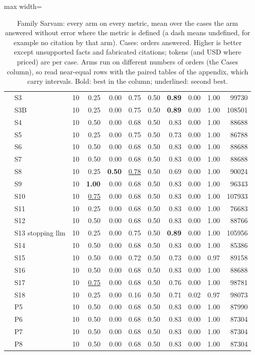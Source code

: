 \begin{table}[t]
\begin{adjustbox}{max width=\textwidth}
\begin{tabular}{@{}llrrrrrrrrr@{}}
 & S3 & 10 & 0.25 & 0.00 & 0.75 & 0.50 & \textbf{0.89} & 0.00 & 1.00 & 99730 \\
 & S3B & 10 & 0.25 & 0.00 & 0.75 & 0.50 & \textbf{0.89} & 0.00 & 1.00 & 108501 \\
 & S4 & 10 & 0.50 & 0.00 & 0.68 & 0.50 & 0.83 & 0.00 & 1.00 & 88688 \\
 & S5 & 10 & 0.25 & 0.00 & 0.75 & 0.50 & 0.73 & 0.00 & 1.00 & 86788 \\
 & S6 & 10 & 0.50 & 0.00 & 0.68 & 0.50 & 0.83 & 0.00 & 1.00 & 88688 \\
 & S7 & 10 & 0.50 & 0.00 & 0.68 & 0.50 & 0.83 & 0.00 & 1.00 & 88688 \\
 & S8 & 10 & 0.25 & \textbf{0.50} & \underline{0.78} & 0.50 & 0.69 & 0.00 & 1.00 & 90024 \\
 & S9 & 10 & \textbf{1.00} & 0.00 & 0.68 & 0.50 & 0.83 & 0.00 & 1.00 & 96343 \\
 & S10 & 10 & \underline{0.75} & 0.00 & 0.68 & 0.50 & 0.83 & 0.00 & 1.00 & 107933 \\
 & S11 & 10 & 0.25 & 0.00 & 0.68 & 0.50 & 0.83 & 0.00 & 1.00 & 76683 \\
 & S12 & 10 & 0.50 & 0.00 & 0.68 & 0.50 & 0.83 & 0.00 & 1.00 & 88766 \\
 & S13 stopping llm & 10 & 0.25 & 0.00 & 0.75 & 0.50 & \textbf{0.89} & 0.00 & 1.00 & 105956 \\
 & S14 & 10 & 0.50 & 0.00 & 0.68 & 0.50 & 0.83 & 0.00 & 1.00 & 85386 \\
 & S15 & 10 & 0.50 & 0.00 & 0.72 & 0.50 & 0.73 & 0.00 & 0.97 & 89158 \\
 & S16 & 10 & 0.50 & 0.00 & 0.68 & 0.50 & 0.83 & 0.00 & 1.00 & 88688 \\
 & S17 & 10 & \underline{0.75} & 0.00 & 0.68 & 0.50 & 0.76 & 0.00 & 1.00 & 98781 \\
 & S18 & 10 & 0.25 & 0.00 & 0.16 & 0.50 & 0.71 & 0.02 & 0.97 & 98073 \\
 & P5 & 10 & 0.50 & 0.00 & 0.68 & 0.50 & 0.83 & 0.00 & 1.00 & 87990 \\
 & P6 & 10 & 0.50 & 0.00 & 0.68 & 0.50 & 0.83 & 0.00 & 1.00 & 87304 \\
 & P7 & 10 & 0.50 & 0.00 & 0.68 & 0.50 & 0.83 & 0.00 & 1.00 & 87304 \\
 & P8 & 10 & 0.50 & 0.00 & 0.68 & 0.50 & 0.83 & 0.00 & 1.00 & 87304 \\
\bottomrule
\end{tabular}
\end{adjustbox}
\caption{Family Sarvam: every arm on every metric, mean over the cases the arm answered without error where the metric is defined (a dash means undefined, for example no citation by that arm). Cases: orders answered. Higher is better except unsupported facts and fabricated citations; tokens (and USD where priced) are per case. Arms run on different numbers of orders (the Cases column), so read near-equal rows with the paired tables of the appendix, which carry intervals. Bold: best in the column; underlined: second best.}
\label{tab:master_sarvam}
\end{table}